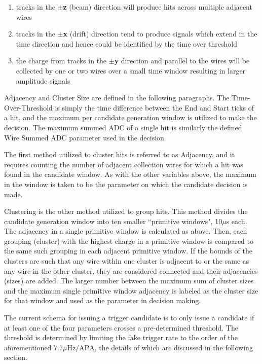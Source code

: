 \documentclass[10pt]{article}
\begin{document}
\begin{enumerate}
\setlength\itemsep{0em}
    \item tracks in the $\pm$\textbf{z} (beam) direction will produce hits across multiple adjacent wires
    \item tracks in the $\pm$\textbf{x} (drift) direction tend to produce signals which extend in the time direction and hence could be identified by the time over threshold
    \item the charge from tracks in the $\pm$\textbf{y} direction and parallel to the wires will be collected by one or two wires over a small time window resulting in larger amplitude signals
\end{enumerate}

Adjacency and Cluster Size are defined in the following paragraphs. The Time-Over-Threshold is simply the time difference between the End and Start ticks of a hit, and the maximum per candidate generation window is utilized to make the decision. The maximum summed ADC of a single hit is similarly the defined Wire Summed ADC parameter used in the decision.

The first method utilized to cluster hits is referred to as Adjacency, and it requires counting the number of adjacent collection wires for which a hit was found in the candidate window. As with the other variables above, the maximum in the window is taken to be the parameter on which the candidate decision is made.

Clustering is the other method utilized to group hits. This method divides the candidate generation window into ten smaller ``primitive windows", 10$\mu$s each. The adjacency in a single primitive window is calculated as above. Then, each grouping (cluster) with the highest charge in a primitive window is compared to the same such grouping in each adjacent primitive window. If the bounds of the clusters are such that any wire within one cluster is adjacent to or the same as any wire in the other cluster, they are considered connected and their adjacencies (sizes) are added. The larger number between the maximum sum of cluster sizes and the maximum single primitive window adjacency is labeled as the cluster size for that window and used as the parameter in decision making.

The current schema for issuing a trigger candidate is to only issue a candidate if at least one of the four parameters crosses a pre-determined threshold. The threshold is determined by limiting the fake trigger rate to the order of the aforementioned 7.7$\mu \text{Hz}/\text{APA}$, the details of which are discussed in the following section.
\end{document}
